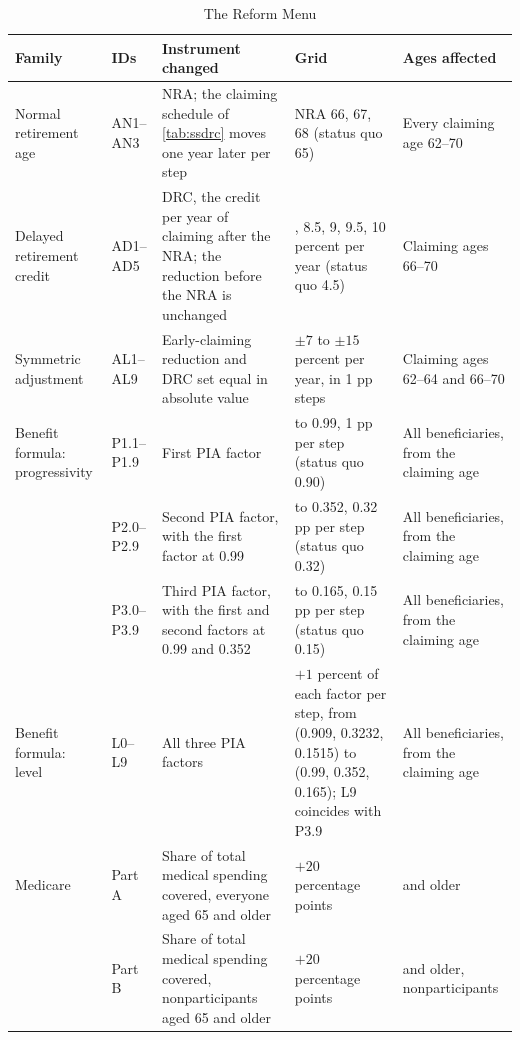 \begin{table}[!t]
\centering
\caption{The Reform Menu}
\label{tab:menu}
\vspace{6pt}
\scriptsize
\setlength{\tabcolsep}{4pt}
\renewcommand{\arraystretch}{1.05}
\begin{threeparttable}
\begin{tabular}{@{}>{\raggedright\arraybackslash}p{1.05in}>{\raggedright\arraybackslash}p{0.7in}>{\raggedright\arraybackslash}p{1.75in}>{\raggedright\arraybackslash}p{1.6in}>{\raggedright\arraybackslash}p{1.05in}@{}}
\toprule
Family & IDs & Instrument changed & Grid & Ages affected \\
\midrule
Normal retirement age & AN1--AN3 & NRA; the claiming schedule of \autoref{tab:ssdrc} moves one year later per step & NRA 66, 67, 68 (status quo 65) & Every claiming age 62--70 \\
\addlinespace
Delayed retirement credit & AD1--AD5 & DRC, the credit per year of claiming after the NRA; the reduction before the NRA is unchanged & 8, 8.5, 9, 9.5, 10 percent per year (status quo 4.5) & Claiming ages 66--70 \\
\addlinespace
Symmetric adjustment & AL1--AL9 & Early-claiming reduction and DRC set equal in absolute value & $\pm7$ to $\pm15$ percent per year, in 1 pp steps & Claiming ages 62--64 and 66--70 \\
\addlinespace
Benefit formula: progressivity & P1.1--P1.9 & First PIA factor & 0.91 to 0.99, 1 pp per step (status quo 0.90) & All beneficiaries, from the claiming age \\
 & P2.0--P2.9 & Second PIA factor, with the first factor at 0.99 & 0.3232 to 0.352, 0.32 pp per step (status quo 0.32) & All beneficiaries, from the claiming age \\
 & P3.0--P3.9 & Third PIA factor, with the first and second factors at 0.99 and 0.352 & 0.1515 to 0.165, 0.15 pp per step (status quo 0.15) & All beneficiaries, from the claiming age \\
\addlinespace
Benefit formula: level & L0--L9 & All three PIA factors & $+1$ percent of each factor per step, from (0.909, 0.3232, 0.1515) to (0.99, 0.352, 0.165); L9 coincides with P3.9\tnote{a} & All beneficiaries, from the claiming age \\
\addlinespace
Medicare & Part A & Share of total medical spending covered, everyone aged 65 and older & $+20$ percentage points & 65 and older \\
 & Part B & Share of total medical spending covered, nonparticipants aged 65 and older & $+20$ percentage points & 65 and older, nonparticipants \\

\end{tabular}
\end{threeparttable}
\end{table}
